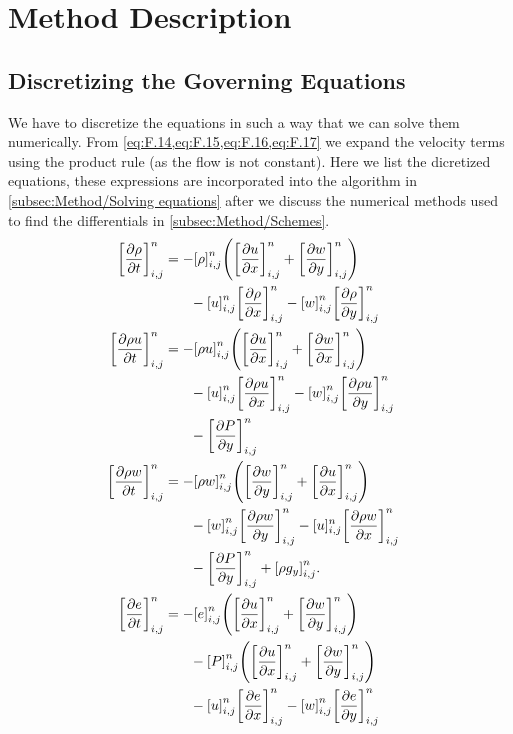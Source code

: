 \documentclass[11pt,a4paper,twocolumn,titlepage]{article}
\newcommand{\disc}[1]    %
{
\ensuremath
\qty[#1]_{i,j}^{n}
}
\begin{document}
\section{Method Description}\label{sec:Method}
\subsection{Discretizing the Governing Equations}\label{subsec:Method/Discretizing}
We have to discretize the equations in such a way that we can solve them numerically. From \cref{eq:F.14,eq:F.15,eq:F.16,eq:F.17} we expand the velocity terms using the product rule (as the flow is not constant). Here we list the dicretized equations, these expressions are incorporated into the algorithm in \ref{subsec:Method/Solving equations} after we discuss the numerical methods used to find the differentials in \cref{subsec:Method/Schemes}.
{\small
\begin{align}
\disc{\pdv{\rho}{t}} &= -\disc{\rho}\qty(\disc{\pdv{u}{x}}+\disc{\pdv{w}{y}}) \notag\\
&\phantom{{}=1} - \disc{u}\disc{\pdv{\rho}{x}} - \disc{w}\disc{\pdv{\rho}{y}}
\label{eq:Disc rho}
\\
\disc{\pdv{\rho u}{t}} &= -\disc{\rho u}\qty(\disc{\pdv{u}{x}} + \disc{\pdv{w}{x}}) \notag \\
&\phantom{{}=1} - \disc{u}\disc{\pdv{\rho u}{x}} - \disc{w}\disc{\pdv{\rho u}{y}} \notag \\
&\phantom{{}=1} - \disc{\pdv{P}{y}}
\label{eq:Disc rhou}
\\
\qty[\pdv{\rho w}{t}]_{i,j}^n &=- \qty[\rho w]_{i,j}^n\qty(\qty[\pdv{w}{y}]_{i,j}^n + \qty[\pdv{u}{x}]_{i,j}^n) \notag\\
&\phantom{{}=1}- \qty[w]_{i,j}^n\qty[\pdv{\rho w}{y}]_{i,j}^n - [u]_{i,j}^n\qty[\pdv{\rho w}{x}]_{i,j}^n \notag\\
&\phantom{{}=1}- \qty[\pdv{P}{y}]_{i,j}^n + \qty[\rho g_y]_{i,j}^n.
\label{eq:Disc rhow}
\\
\qty[\pdv{e}{t}]_{i,j}^n &= -\qty[e]_{i,j}^n\qty(\qty[\pdv{u}{x}]_{i,j}^n +\qty[\pdv{w}{y}]_{i,j}^n) \notag\\
&\phantom{{}=1} - \qty[P]_{i,j}^n\qty(\disc{\pdv{u}{x}} + \disc{\pdv{w}{y}})  \notag\\
&\phantom{{}=1} - \disc{u}\disc{\pdv{e}{x}} - \disc{w}\disc{\pdv{e}{y}} &
\label{eq:Disc e}
\end{align}%
}%
\end{document}
